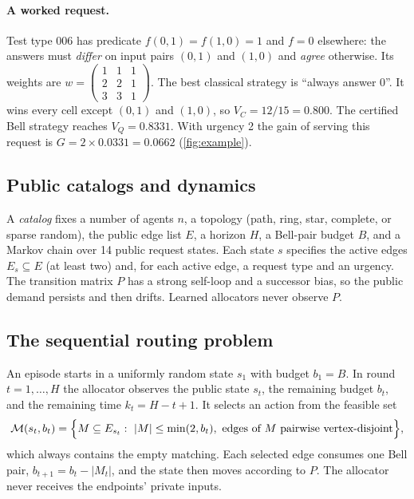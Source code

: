 \documentclass[11pt,a4paper]{article}
\newcommand{\M}{\mathcal{M}}
\begin{document}
\paragraph{A worked request.} Test type 006 has predicate $f(0,1)=f(1,0)=1$ and $f=0$ elsewhere: the answers must \emph{differ} on input pairs $(0,1)$ and $(1,0)$ and \emph{agree} otherwise. Its weights are $w=\left(\begin{smallmatrix}1&1&1\\2&2&1\\3&3&1\end{smallmatrix}\right)$. The best classical strategy is ``always answer 0''. It wins every cell except $(0,1)$ and $(1,0)$, so $V_C=12/15=0.800$. The certified Bell strategy reaches $V_Q=0.8331$. With urgency 2 the gain of serving this request is $G=2\times0.0331=0.0662$ (\cref{fig:example}).

\subsection{Public catalogs and dynamics}\label{sec:catalogs}

A \emph{catalog} fixes a number of agents $n$, a topology (path, ring, star, complete, or sparse random), the public edge list $E$, a horizon $H$, a Bell-pair budget $B$, and a Markov chain over 14 public request states. Each state $s$ specifies the active edges $E_s\subseteq E$ (at least two) and, for each active edge, a request type and an urgency. The transition matrix $P$ has a strong self-loop and a successor bias, so the public demand persists and then drifts. Learned allocators never observe $P$.

\subsection{The sequential routing problem}\label{sec:mdp}

An episode starts in a uniformly random state $s_1$ with budget $b_1=B$. In round $t=1,\dots,H$ the allocator observes the public state $s_t$, the remaining budget $b_t$, and the remaining time $k_t=H-t+1$. It selects an action from the feasible set
\begin{equation}
  \M(s_t,b_t)=\Bigl\{M\subseteq E_{s_t}:\ |M|\le\min(2,b_t),\ \text{edges of }M\text{ pairwise vertex-disjoint}\Bigr\},
  \label{eq:feasible}
\end{equation}
which always contains the empty matching. Each selected edge consumes one Bell pair, $b_{t+1}=b_t-|M_t|$, and the state then moves according to $P$. The allocator never receives the endpoints' private inputs.
\end{document}
